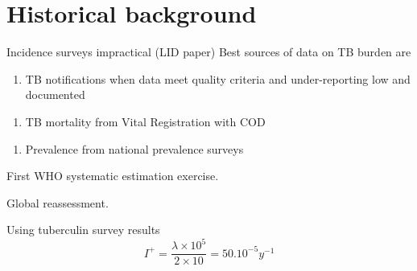 \section{Historical background}

Incidence surveys impractical (LID paper)
Best sources of data on TB burden are 
\begin{enumerate}
\item TB notifications when data meet quality criteria and under-reporting low and documented
\end{enumerate}
\begin{enumerate}
\item TB mortality from Vital Registration with COD
\end{enumerate}
\begin{enumerate}
\item Prevalence from national prevalence surveys
\end{enumerate}

First WHO systematic estimation exercise\cite{1600578}.

Global reassessment\cite{10517722}.

Using tuberculin survey results\cite{Styblo1985}
$$I^+ = \frac{\lambda \times 10^5}{2 \times 10} = 50.10^{-5} y^{-1}$$

  
  
  
  
  